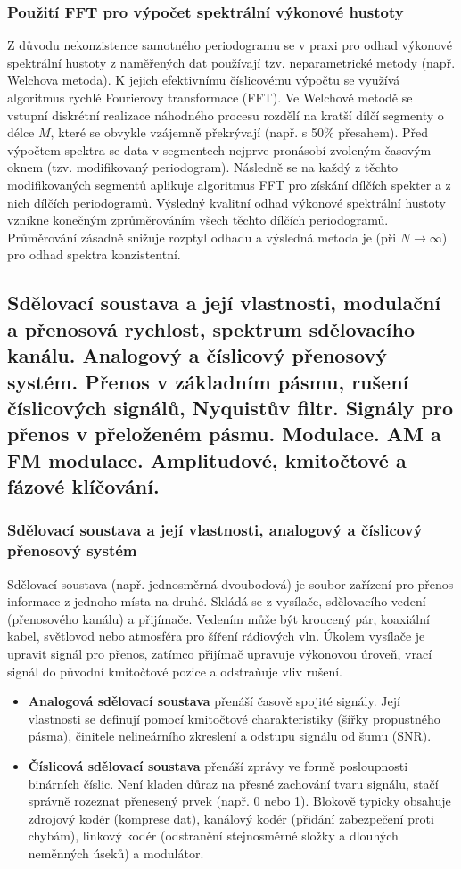     \subsubsection{Použití FFT pro výpočet spektrální výkonové hustoty} 
        Z důvodu nekonzistence samotného periodogramu se v praxi pro odhad výkonové spektrální hustoty z naměřených dat používají tzv. neparametrické metody (např. Welchova metoda). K jejich efektivnímu číslicovému výpočtu se využívá algoritmus rychlé Fourierovy transformace (FFT). Ve Welchově metodě se vstupní diskrétní realizace náhodného procesu rozdělí na kratší dílčí segmenty o délce $M$, které se obvykle vzájemně překrývají (např. s 50\% přesahem). Před výpočtem spektra se data v segmentech nejprve pronásobí zvoleným časovým oknem (tzv. modifikovaný periodogram). Následně se na každý z těchto modifikovaných segmentů aplikuje algoritmus FFT pro získání dílčích spekter a z nich dílčích periodogramů. Výsledný kvalitní odhad výkonové spektrální hustoty vznikne konečným zprůměrováním všech těchto dílčích periodogramů. Průměrování zásadně snižuje rozptyl odhadu a výsledná metoda je (při $N \to \infty$) pro odhad spektra konzistentní.
\subsection{Sdělovací soustava a její vlastnosti, modulační a přenosová rychlost, spektrum sdělovacího kanálu. Analogový a číslicový přenosový systém. Přenos v základním pásmu, rušení číslicových signálů, Nyquistův filtr. Signály pro přenos v přeloženém pásmu. Modulace. AM a FM modulace. Amplitudové, kmitočtové a fázové klíčování. }
    \subsubsection{Sdělovací soustava a její vlastnosti, analogový a číslicový přenosový systém} 
        Sdělovací soustava (např. jednosměrná dvoubodová) je soubor zařízení pro přenos informace z jednoho místa na druhé. Skládá se z vysílače, sdělovacího vedení (přenosového kanálu) a přijímače. Vedením může být kroucený pár, koaxiální kabel, světlovod nebo atmosféra pro šíření rádiových vln. Úkolem vysílače je upravit signál pro přenos, zatímco přijímač upravuje výkonovou úroveň, vrací signál do původní kmitočtové pozice a odstraňuje vliv rušení.

    \begin{itemize}
        \item \textbf{Analogová sdělovací soustava} přenáší časově spojité signály. Její vlastnosti se definují pomocí kmitočtové charakteristiky (šířky propustného pásma), činitele nelineárního zkreslení a odstupu signálu od šumu (SNR).
        \item \textbf{Číslicová sdělovací soustava} přenáší zprávy ve formě posloupnosti binárních číslic. Není kladen důraz na přesné zachování tvaru signálu, stačí správně rozeznat přenesený prvek (např. 0 nebo 1). Blokově typicky obsahuje zdrojový kodér (komprese dat), kanálový kodér (přidání zabezpečení proti chybám), linkový kodér (odstranění stejnosměrné složky a dlouhých neměnných úseků) a modulátor.
    \end{itemize}
    
